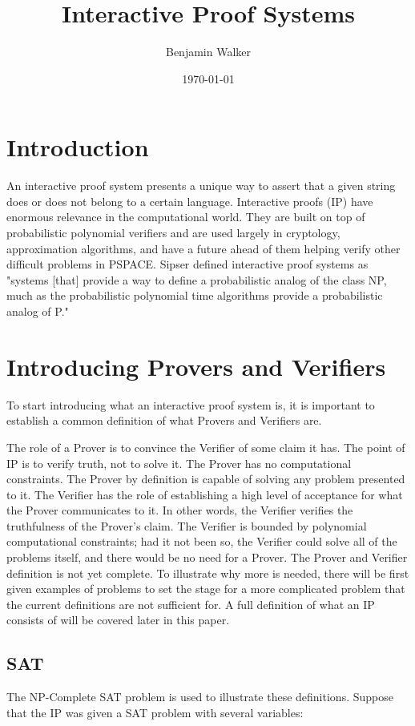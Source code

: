 \documentclass[12pt]{article}
\author{Benjamin Walker}
\title{Interactive Proof Systems}
\date{\today{}}
\begin{document}
\maketitle

\section{Introduction}

An interactive proof system presents a unique way to assert that a given string does or does not belong to a certain language. Interactive proofs (IP) have enormous relevance in the computational world. They are built on top of probabilistic polynomial verifiers and are used largely in cryptology, approximation algorithms, and have a future ahead of them helping verify other difficult problems in PSPACE. Sipser defined interactive proof systems as "systems [that] provide a way to define a probabilistic analog of the class NP, much as the probabilistic polynomial time algorithms provide a probabilistic analog of P." \cite{sipser}

\section{Introducing Provers and Verifiers}
To start introducing what an interactive proof system is, it is important to establish a common definition of what Provers and Verifiers are.

The role of a Prover is to convince the Verifier of some claim it has. The point of IP is to verify truth, not to solve it. The Prover has no computational constraints. The Prover by definition is capable of solving any problem presented to it. The Verifier has the role of establishing a high level of acceptance for what the Prover communicates to it. In other words, the Verifier verifies the truthfulness of the Prover's claim. The Verifier is bounded by polynomial computational constraints; had it not been so, the Verifier could solve all of the problems itself, and there would be no need for a Prover. The Prover and Verifier definition is not yet complete. To illustrate why more is needed, there will be first given examples of problems to set the stage for a more complicated problem that the current definitions are not sufficient for. A full definition of what an IP consists of will be covered later in this paper.

\subsection{SAT}
The NP-Complete SAT problem is used to illustrate these definitions. Suppose that the IP was given a SAT problem with several variables:
\end{document}
